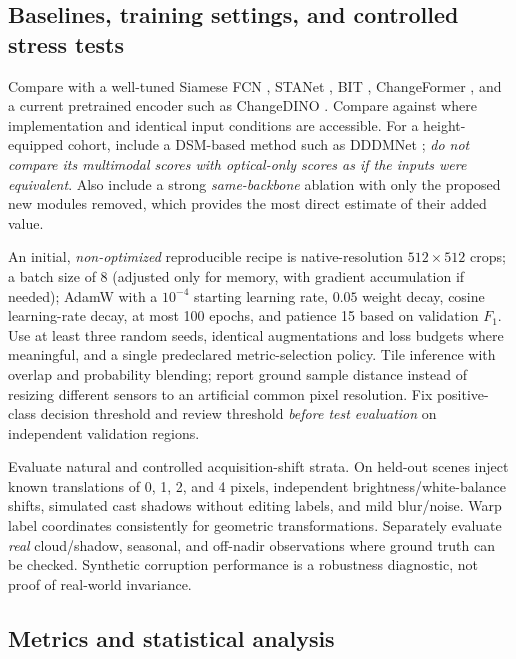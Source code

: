 \subsection{Baselines, training settings, and controlled stress tests}

Compare with a well-tuned Siamese FCN \citep{Daudt2018}, STANet \citep{ChenShi2020}, BIT \citep{ChenBIT2022}, ChangeFormer \citep{Bandara2022}, and a current pretrained encoder such as ChangeDINO \citep{ChengHsu2026}. Compare against \citet{Lu2026} where implementation and identical input conditions are accessible. For a height-equipped cohort, include a DSM-based method such as DDDMNet \citep{Fu2025}; \emph{do not compare its multimodal scores with optical-only scores as if the inputs were equivalent}. Also include a strong \emph{same-backbone} ablation with only the proposed new modules removed, which provides the most direct estimate of their added value.

An initial, \emph{non-optimized} reproducible recipe is native-resolution $512\times512$ crops; a batch size of 8 (adjusted only for memory, with gradient accumulation if needed); AdamW with a $10^{-4}$ starting learning rate, $0.05$ weight decay, cosine learning-rate decay, at most 100 epochs, and patience 15 based on validation $F_1$. Use at least three random seeds, identical augmentations and loss budgets where meaningful, and a single predeclared metric-selection policy. Tile inference with overlap and probability blending; report ground sample distance instead of resizing different sensors to an artificial common pixel resolution. Fix positive-class decision threshold and review threshold \emph{before test evaluation} on independent validation regions.

Evaluate natural and controlled acquisition-shift strata. On held-out scenes inject known translations of 0, 1, 2, and 4 pixels, independent brightness/white-balance shifts, simulated cast shadows without editing labels, and mild blur/noise. Warp label coordinates consistently for geometric transformations. Separately evaluate \emph{real} cloud/shadow, seasonal, and off-nadir observations where ground truth can be checked. Synthetic corruption performance is a robustness diagnostic, not proof of real-world invariance.

\subsection{Metrics and statistical analysis}

